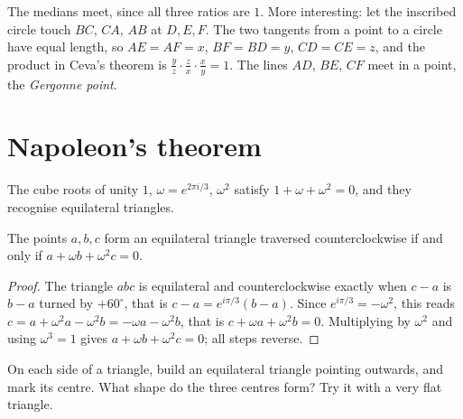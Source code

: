 \begin{example}\label{exa:gergonne}
The medians meet, since all three ratios are $1$. More interesting: let the inscribed circle touch $BC$, $CA$, $AB$ at $D,E,F$. The two
tangents from a point to a circle have equal length, so $AE=AF=x$, $BF=BD=y$, $CD=CE=z$, and the product in Ceva's theorem is
$\frac yz\cdot\frac zx\cdot\frac xy=1$. The lines $AD$, $BE$, $CF$ meet in a point, the \emph{Gergonne point}.
\end{example}

\section{Napoleon's theorem}

The cube roots of unity $1$, $\omega=e^{2\pi i/3}$, $\omega^2$ satisfy $1+\omega+\omega^2=0$, and they recognise equilateral
triangles.

\begin{lemma}\label{lem:equilateral}
The points $a,b,c$ form an equilateral triangle traversed counterclockwise if and only if $a+\omega b+\omega^2c=0$.
\end{lemma}
\begin{proof}
The triangle $abc$ is equilateral and counterclockwise exactly when $c-a$ is $b-a$ turned by $+60^\circ$, that is
$c-a=e^{i\pi/3}(b-a)$. Since $e^{i\pi/3}=-\omega^2$, this reads $c=a+\omega^2a-\omega^2b=-\omega a-\omega^2b$, that is
$c+\omega a+\omega^2b=0$. Multiplying by $\omega^2$ and using $\omega^3=1$ gives $a+\omega b+\omega^2c=0$; all steps reverse.
\end{proof}

\begin{think}
On each side of a triangle, build an equilateral triangle pointing outwards, and mark its centre. What shape do the three centres form?
Try it with a very flat triangle.
\end{think}


